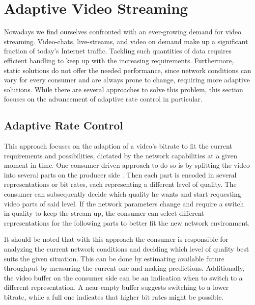 \section{Adaptive Video Streaming}
Nowadays we find ourselves confronted with an ever-growing demand for video streaming. Video-chats, live-streams, and video on demand make up a significant fraction of today's Internet traffic. Tackling such quantities of data requires efficient handling to keep up with the increasing requirements. Furthermore, static solutions do not offer the needed performance, since network conditions can vary for every consumer and are always prone to change, requiring more adaptive solutions. While there are several approaches to solve this problem, this section focuses on the advancement of adaptive rate control in particular. 

\subsection{Adaptive Rate Control}
This approach focuses on the adaption of a video's bitrate to fit the current requirements and possibilities, dictated by the network capabilities at a given moment in time. One consumer-driven approach to do so is by splitting the video into several parts on the producer side \cite{MQGW12}. Then each part is encoded in several representations or bit rates, each representing a different level of quality. The consumer can subsequently decide which quality he wants and start requesting video parts of said level. If the network parameters change and require a switch in quality to keep the stream up, the consumer can select different representations for the following parts to better fit the new network environment.

It should be noted that with this approach the consumer is responsible for analyzing the current network conditions and deciding which level of quality best suits the given situation. This can be done by estimating available future throughput by measuring the current one and making predictions. Additionally, the video buffer on the consumer side can be an indication when to switch to a different representation. A near-empty buffer suggests switching to a lower bitrate, while a full one indicates that higher bit rates might be possible. \cite{MQGW12}

